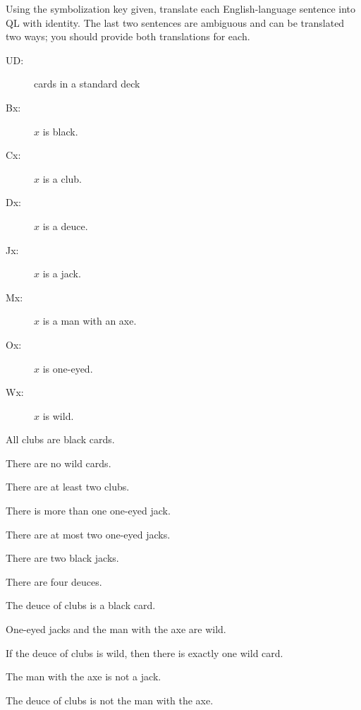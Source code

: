 \problempart
\label{pr.QLcards}
Using the symbolization key given, translate each English-language sentence into QL with identity. The last two sentences are ambiguous and can be translated two ways; you should provide both translations for each.
\begin{description}
\item[UD:] cards in a standard deck
\item[Bx:] $x$ is black.
\item[Cx:] $x$ is a club.
\item[Dx:] $x$ is a deuce.
\item[Jx:] $x$ is a jack.
\item[Mx:] $x$ is a man with an axe.
\item[Ox:] $x$ is one-eyed.
\item[Wx:] $x$ is wild.
\end{description}
\begin{kormanize}
\item All clubs are black cards.
\item There are no wild cards.
\item There are at least two clubs.
\item There is more than one one-eyed jack.
\item There are at most two one-eyed jacks.
\item There are two black jacks.
\item There are four deuces.
\item The deuce of clubs is a black card.
\item One-eyed jacks and the man with the axe are wild.
\item If the deuce of clubs is wild, then there is exactly one wild card.
\item The man with the axe is not a jack.
\item The deuce of clubs is not the man with the axe.
\end{kormanize}


